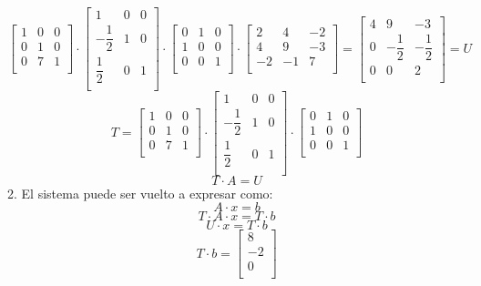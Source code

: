 \documentclass{article}
\begin{document}
\[
\begin{bmatrix}
1 & 0 & 0 \\
0 & 1 & 0 \\
0 & 7 & 1 \\
\end{bmatrix}
\cdot
\begin{bmatrix}
1 & 0 & 0 \\
-\dfrac{1}{2} & 1 & 0 \\
\dfrac{1}{2} & 0 & 1 \\
\end{bmatrix}
\cdot
\begin{bmatrix}
0 & 1 & 0 \\
1 & 0 & 0 \\
0 & 0 & 1 \\
\end{bmatrix}
\cdot
\begin{bmatrix}
2 & 4 & -2 \\
4 & 9 & -3 \\
-2 & -1 & 7 \\
\end{bmatrix}
=
\begin{bmatrix}
4 & 9 & -3 \\
0 & -\dfrac{1}{2} & -\dfrac{1}{2} \\
0 & 0 & 2 \\
\end{bmatrix} = U
\]
\[
T =
\begin{bmatrix}
1 & 0 & 0 \\
0 & 1 & 0 \\
0 & 7 & 1 \\
\end{bmatrix}
\cdot
\begin{bmatrix}
1 & 0 & 0 \\
-\dfrac{1}{2} & 1 & 0 \\
\dfrac{1}{2} & 0 & 1 \\
\end{bmatrix} 
\cdot
\begin{bmatrix}
0 & 1 & 0 \\
1 & 0 & 0 \\
0 & 0 & 1 \\
\end{bmatrix}
\]
\[
T \cdot A = U
\]
2. El sistema puede ser vuelto a expresar como: \\
\[
    A \cdot x = b  
\]
\[
    T \cdot A \cdot x = T \cdot b  
\]
\[
    U \cdot x = T \cdot b  
\]
\[
    T \cdot b =
    \begin{bmatrix}
    8 \\
    -2 \\
    0 \\
    \end{bmatrix}
\]
\end{document}
